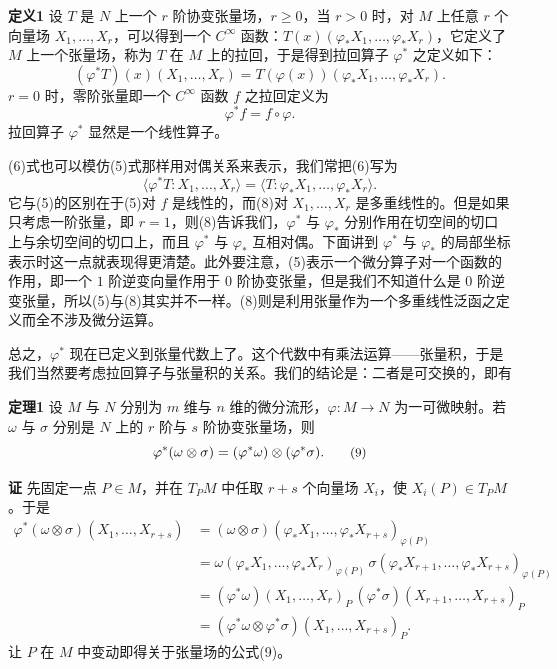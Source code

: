 \noindent\textbf{定义1}
设 $T$ 是 $N$ 上一个 $r$ 阶协变张量场，$r\ge0$，当 $r>0$ 时，对 $M$ 上任意 $r$ 个向量场 $X_1,\ldots,X_r$，可以得到一个 $C^\infty$ 函数：$T(x)(\varphi_*X_1,\ldots,\varphi_*X_r)$，它定义了 $M$ 上一个张量场，称为 $T$ 在 $M$ 上的拉回，于是得到拉回算子 $\varphi^*$ 之定义如下：
\begin{equation}
 (\varphi^*T)(x)(X_1,\ldots,X_r)=T(\varphi(x))(\varphi_*X_1,\ldots,\varphi_*X_r).
 \tag{6}
\end{equation}
$r=0$ 时，零阶张量即一个 $C^\infty$ 函数 $f$ 之拉回定义为
\begin{equation}
 \varphi^*f=f\circ\varphi.
 \tag{7}
\end{equation}
拉回算子 $\varphi^*$ 显然是一个线性算子。

(6)式也可以模仿(5)式那样用对偶关系来表示，我们常把(6)写为
\begin{equation}
 \langle\varphi^*T:X_1,\ldots,X_r\rangle
 =\langle T:\varphi_*X_1,\ldots,\varphi_*X_r\rangle.
 \tag{8}
\end{equation}
它与(5)的区别在于(5)对 $f$ 是线性的，而(8)对 $X_1,\ldots,X_r$ 是多重线性的。但是如果只考虑一阶张量，即 $r=1$，则(8)告诉我们，$\varphi^*$ 与 $\varphi_*$ 分别作用在切空间的切口上与余切空间的切口上，而且 $\varphi^*$ 与 $\varphi_*$ 互相对偶。下面讲到 $\varphi^*$ 与 $\varphi_*$ 的局部坐标表示时这一点就表现得更清楚。此外要注意，(5)表示一个微分算子对一个函数的作用，即一个 $1$ 阶逆变向量作用于 $0$ 阶协变张量，但是我们不知道什么是 $0$ 阶逆变张量，所以(5)与(8)其实并不一样。(8)则是利用张量作为一个多重线性泛函之定义而全不涉及微分运算。

总之，$\varphi^*$ 现在已定义到张量代数上了。这个代数中有乘法运算——张量积，于是我们当然要考虑拉回算子与张量积的关系。我们的结论是：二者是可交换的，即有

\noindent\textbf{定理1}
设 $M$ 与 $N$ 分别为 $m$ 维与 $n$ 维的微分流形，$\varphi:M\to N$ 为一可微映射。若 $\omega$ 与 $\sigma$ 分别是 $N$ 上的 $r$ 阶与 $s$ 阶协变张量场，则
\begin{equation}
 \small
 \varphi^*(\omega\otimes\sigma)=(\varphi^*\omega)\otimes(\varphi^*\sigma).
 \tag{9}
\end{equation}

\noindent\textbf{证}
先固定一点 $P\in M$，并在 $T_PM$ 中任取 $r+s$ 个向量场 $X_i$，使 $X_i(P)\in T_PM$。于是
\begin{align*}
 \varphi^*(\omega\otimes\sigma)(X_1,\ldots,X_{r+s})
 &= (\omega\otimes\sigma)(\varphi_*X_1,\ldots,\varphi_*X_{r+s})_{\varphi(P)}\\
 &= \omega(\varphi_*X_1,\ldots,\varphi_*X_r)_{\varphi(P)}\,
    \sigma(\varphi_*X_{r+1},\ldots,\varphi_*X_{r+s})_{\varphi(P)}\\
 &= (\varphi^*\omega)(X_1,\ldots,X_r)_P\,
    (\varphi^*\sigma)(X_{r+1},\ldots,X_{r+s})_P\\
 &= (\varphi^*\omega\otimes\varphi^*\sigma)(X_1,\ldots,X_{r+s})_P.
\end{align*}
让 $P$ 在 $M$ 中变动即得关于张量场的公式(9)。

